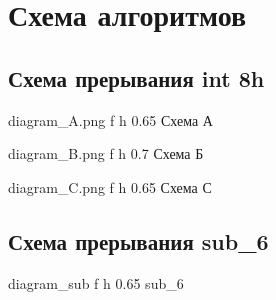 \documentclass[a4paper,12pt]{bmstu}
\begin{document}
\chapter{Схема алгоритмов}\label{ch:alg}
\section{Схема прерывания int 8h}\label{sec:int}
{diagram_A.png} %
{f} %
{h} %
{0.65\textwidth} %
{Схема А} %
\clearpage

{diagram_B.png} %
{f} %
{h} %
{0.7\textwidth} %
{Схема Б} %
\clearpage

{diagram_C.png} %
{f} %
{h} %
{0.65\textwidth} %
{Схема С} %
\clearpage

\section{Схема прерывания sub\_6}\label{sec:sub}
{diagram_sub} %
{f} %
{h} %
{0.65\textwidth} %
{sub\_6} %
\end{document}
